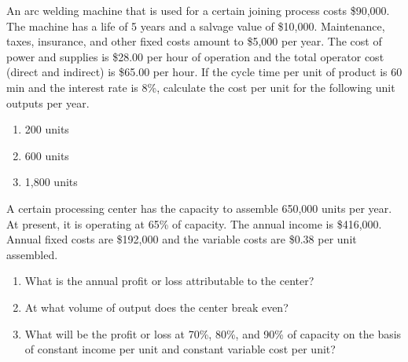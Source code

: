 \begin{exercises}
    \begin{exercise}
    \label{sea-8-28}
        An arc welding machine that is used for a certain joining process costs \$90,000. The machine has a life of 5 years and a salvage value of \$10,000. Maintenance, taxes, insurance, and other fixed costs amount to \$5,000 per year. The cost of power and supplies is \$28.00 per hour of operation and the total operator cost (direct and indirect) is \$65.00 per hour. If the cycle time per unit of product is 60 min and the interest rate is 8\%, calculate the cost per unit for the following unit outputs per year.
        \begin{enumerate}[label=\alph*)]
            \item 200 units
            \item 600 units
            \item 1,800 units
        \end{enumerate}
    \end{exercise}
    \begin{solution}
    \end{solution}
    
    \begin{exercise}
    \label{sea-8-29}
        A certain processing center has the capacity to assemble 650,000 units per year. At present, it is operating at 65\% of capacity. The annual income is \$416,000. Annual fixed costs are \$192,000 and the variable costs are \$0.38 per unit assembled.
        \begin{enumerate}[label=\alph*)]
            \item What is the annual profit or loss attributable to the center?
            \item At what volume of output does the center break even?
            \item What will be the profit or loss at 70\%, 80\%, and 90\% of capacity on the basis of constant income per unit and constant variable cost per unit?
        \end{enumerate}
    \end{exercise}
    \begin{solution}
    \end{solution}
    

\end{exercises}
